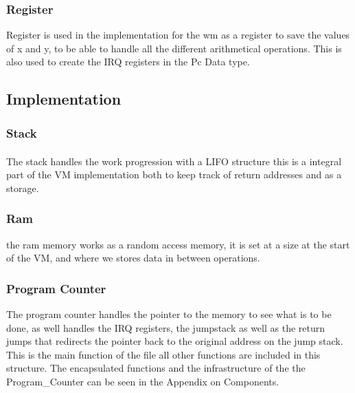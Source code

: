 \documentclass{article}
\begin{document}
\subsubsection{Register}

Register is used in the implementation for the wm as a register to save the
values of x and y, to be able to handle all the different arithmetical operations. This is also used to create the IRQ registers in the Pc Data type.

\subsection{Implementation}
\subsubsection{Stack}

The stack handles the work progression with a LIFO\textsuperscript{\cite{lifo}}
structure this is a integral part of the VM implementation both to keep track of
return addresses and as a storage.

\subsubsection{Ram}
the ram memory works as a random access memory, it is set at a size
at the start of the VM, and where we stores data in between operations.

\subsubsection{Program Counter}
The program counter handles the pointer to the memory to see what is to be
done, as well handles the IRQ registers, the jumpstack as well as the
return jumps that redirects the pointer back to the original
address on the jump stack.
This is the main function of the file all other functions are included in this structure.
The encapsulated functions and the infrastructure of the the Program_Counter can be seen in the Appendix on Components.
\end{document}
